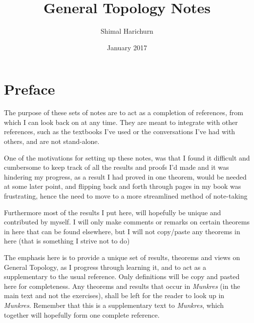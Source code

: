 \documentclass{article}
\title{General Topology Notes}
\author{Shimal Harichurn}
\date{January 2017}
\theoremstyle{remark}
\theoremstyle{definition}
\begin{document}
\maketitle

\newpage

\tableofcontents

\newpage

\section*{Preface}

\begin{flushleft}

The purpose of these sets of notes are to act as a completion of references, from which I can look back on at any time. They are meant to integrate with other references, such as the textbooks I've used or the conversations I've had with others, and are not stand-alone. 
\end{flushleft}

\begin{flushleft}
One of the motivations for setting up these notes, was that I found it difficult and cumbersome to keep track of all the results and proofs I'd made and it was hindering my progress, as a result I had proved in one theorem, would be needed at some later point, and flipping back and forth through pages in my book was frustrating, hence the need to move to a more streamlined method of note-taking
\end{flushleft}

\begin{flushleft}
Furthermore most of the results I put here, will hopefully be unique and contributed by myself. I will only make comments or remarks on certain theorems in here that can be found elsewhere, but I will not copy/paste any theorems in here (that is something I strive not to do)

\end{flushleft}

\begin{flushleft}
The emphasis here is to provide a unique set of results, theorems and views on General Topology, as I progress through learning it, and to act as a supplementary to the usual reference. Only definitions will be copy and pasted here for completeness. Any theorems and results that occur in \textit{Munkres} (in the main text and not the exercises), shall be left for the reader to look up in \textit{Munkres}. Remember that this is a supplementary text to \textit{Munkres}, which together will hopefully form one complete reference.

\end{flushleft}
\end{document}
